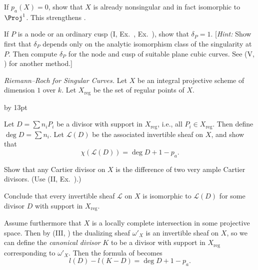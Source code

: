 {{{\noindent\hypertarget{ex-IV-1.8b}{}If $p_a(X)=0$, show that $X$ is already nonsingular and in fact isomorphic to $\Proj^1$. This strengthens .

\noindent\hypertarget{ex-IV-1.8c}{}If $P$ is a node or an ordinary cusp (I, Ex.~, Ex.~), show that $\delta_P=1$. [\emph{Hint:} Show first that $\delta_P$ depends only on the analytic isomorphism class of the singularity at $P$. Then compute $\delta_P$ for the node and cusp of suitable plane cubic curves. See (V, ) for another method.]\par}

\smallskip
\noindent\hypertarget{ex-IV-1.9}{}\emph{Riemann--Roch for Singular Curves.} Let $X$ be an integral projective scheme of dimension $1$ over $k$. Let $X_{\mathrm{reg}}$ be the set of regular points of $X$.
{\advance\leftskip by 13pt\par
\noindent\hypertarget{ex-IV-1.9a}{}Let $D=\sum n_iP_i$ be a divisor with support in $X_{\mathrm{reg}}$, i.e., all $P_i\in X_{\mathrm{reg}}$. Then define $\deg D=\sum n_i$. Let $\mathcal L(D)$ be the associated invertible sheaf on $X$, and show that
\[
\chi(\mathcal L(D))=\deg D+1-p_a.
\]

\noindent\hypertarget{ex-IV-1.9b}{}Show that any Cartier divisor on $X$ is the difference of two very ample Cartier divisors. (Use (II, Ex.~).)

\noindent\hypertarget{ex-IV-1.9c}{}Conclude that every invertible sheaf $\mathcal L$ on $X$ is isomorphic to $\mathcal L(D)$ for some divisor $D$ with support in $X_{\mathrm{reg}}$.

\noindent\hypertarget{ex-IV-1.9d}{}Assume furthermore that $X$ is a locally complete intersection in some projective space. Then by (III, ) the dualizing sheaf $\omega'_X$ is an invertible sheaf on $X$, so we can define the \emph{canonical divisor} $K$ to be a divisor with support in $X_{\mathrm{reg}}$ corresponding to $\omega'_X$. Then the formula of  becomes
\[
l(D)-l(K-D)=\deg D+1-p_a.
\]\par}\par}
}
